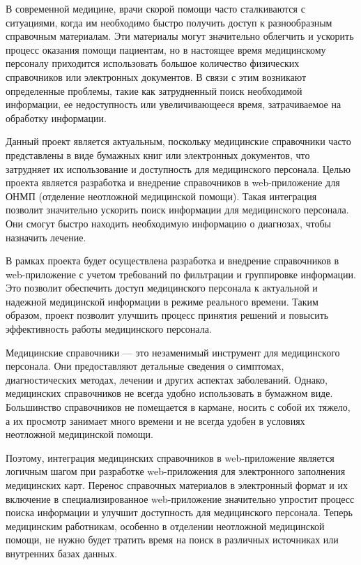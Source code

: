 \introduction %

В современной медицине, врачи скорой помощи часто сталкиваются с ситуациями, когда им необходимо быстро получить доступ к разнообразным справочным материалам. Эти материалы могут значительно облегчить и ускорить процесс оказания помощи пациентам, но в настоящее время медицинскому персоналу приходится использовать большое количество физических справочников или электронных документов. В связи с этим возникают определенные проблемы, такие как затрудненный поиск необходимой информации, ее недоступность или увеличивающееся время, затрачиваемое на обработку информации.

Данный проект является актуальным, поскольку медицинские справочники часто представлены в виде бумажных книг или электронных документов, что затрудняет их использование и доступность для медицинского персонала. Целью проекта является разработка и внедрение справочников в web-приложение для ОНМП (отделение неотложной медицинской помощи). Такая интеграция позволит значительно ускорить поиск информации для медицинского персонала. Они смогут быстро находить необходимую информацию о диагнозах, чтобы назначить лечение.

В рамках проекта будет осуществлена разработка и внедрение справочников в web-приложение с учетом требований по фильтрации и группировке информации. Это позволит обеспечить доступ медицинского персонала к актуальной и надежной медицинской информации в режиме реального времени. Таким образом, проект позволит улучшить процесс принятия решений и повысить эффективность работы медицинского персонала.

Медицинские справочники — это незаменимый инструмент для медицинского персонала. Они предоставляют детальные сведения о симптомах, диагностических методах, лечении и других аспектах заболеваний. Однако, медицинских справочников не всегда удобно использовать в бумажном виде. Большинство справочников не помещается в кармане, носить с собой их тяжело, а их просмотр занимает много времени и не всегда удобен в условиях неотложной медицинской помощи.

Поэтому, интеграция медицинских справочников в web-приложение является логичным шагом при разработке web-приложения для электронного заполнения медицинских карт. Перенос справочных материалов в электронный формат и их включение в специализированное web-приложение значительно упростит процесс поиска информации и улучшит доступность для медицинского персонала. Теперь медицинским работникам, особенно в отделении неотложной медицинской помощи, не нужно будет тратить время на поиск в различных источниках или внутренних базах данных.

